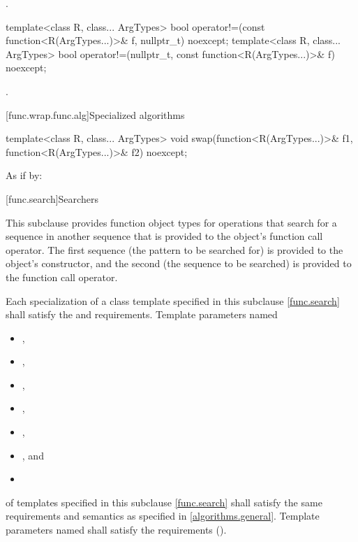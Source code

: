 \begin{itemdescr}
\pnum\returns {}.
\end{itemdescr}

%
\begin{itemdecl}
template<class R, class... ArgTypes>
  bool operator!=(const function<R(ArgTypes...)>& f, nullptr_t) noexcept;
template<class R, class... ArgTypes>
  bool operator!=(nullptr_t, const function<R(ArgTypes...)>& f) noexcept;
\end{itemdecl}

\begin{itemdescr}
\pnum\returns {}.
\end{itemdescr}

[func.wrap.func.alg]{Specialized algorithms}

%
\begin{itemdecl}
template<class R, class... ArgTypes>
  void swap(function<R(ArgTypes...)>& f1, function<R(ArgTypes...)>& f2) noexcept;
\end{itemdecl}

\begin{itemdescr}
\pnum\effects As if by: 
\end{itemdescr}%

[func.search]{Searchers}

\pnum
This subclause provides function object types for
operations that search for a sequence  in another
sequence  that is provided to the object's function call
operator.  The first sequence (the pattern to be searched for) is provided to
the object's constructor, and the second (the sequence to be searched) is
provided to the function call operator.

\pnum
Each specialization of a class template specified in this subclause \ref{func.search}
shall satisfy the  and  requirements.
Template parameters named
\begin{itemize}
\item {},
\item {},
\item {},
\item {},
\item {},
\item {}, and
\item {}
\end{itemize}
of templates specified in this subclause
\ref{func.search} shall satisfy the same requirements and semantics as
specified in \ref{algorithms.general}.
Template parameters named  shall satisfy the 
requirements ().

